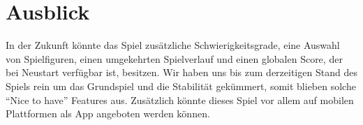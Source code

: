\chapter{Ausblick}
In der Zukunft könnte das Spiel zusätzliche Schwierigkeitsgrade, eine Auswahl von Spielfiguren, einen umgekehrten Spielverlauf und einen globalen Score, der bei Neustart verfügbar ist, besitzen. Wir haben uns bis zum derzeitigen Stand des Spiels rein um das Grundspiel und die Stabilität gekümmert, somit blieben solche ``Nice to have'' Features aus. Zusätzlich könnte dieses Spiel vor allem auf mobilen Plattformen als App angeboten werden können.